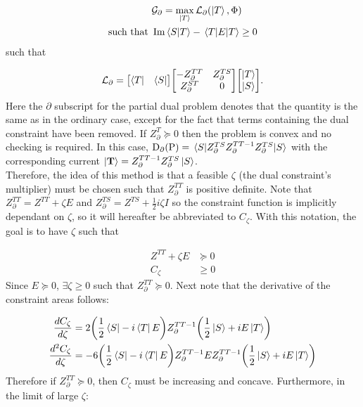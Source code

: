 \documentclass[reprint]{revtex4-2}
\begin{document}
\begin{align}
	&\mathcal{G}_\partial = \max_{\ket{T}}\mathcal{L}_\partial\qty(\ket{T}, \Phi)\\
	\text{such that } &\Im\braket{S}{T} - \ev{E}{T}\ge 0
\end{align}
such that

\begin{align}
	\mathcal{L}_\partial = \mqty[\bra{T} & \bra{S}]\mqty[-Z^{TT}_\partial & Z^{TS}_\partial \\ Z^{ST}_\partial & 0]\mqty[\ket{T} \\ \ket{S}].
\end{align}
Here the $\partial$ subscript for the partial dual problem denotes that the quantity is the same as in the ordinary case, except for the fact that terms containing the dual constraint have been removed. If $Z^{T}_\partial\succcurlyeq 0$ then the problem is convex and no checking is required. In this case, $\text{D}_\partial(\text{P}) = \ev{Z^{TS}_\partial Z^{TT-1}_\partial Z^{TS}_\partial}{S}$ with the corresponding current $\ket{\vb{T}} = Z^{TT-1}_\partial Z^{TS}_\partial\ket{S}$.\\

Therefore, the idea of this method is that a feasible $\zeta$ (the dual constraint's multiplier) must be chosen such that $Z^{TT}_\partial$ is positive definite. Note that $Z^{TT}_\partial = Z^{TT} + \zeta E$ and $Z^{TS}_\partial = Z^{TS} + \frac{1}{2}i\zeta I$ so the constraint function is implicitly dependant on $\zeta$, so it will hereafter be abbreviated to $C_\zeta$. With this notation, the goal is to have $\zeta$ such that

\begin{align}
	Z^{TT}+\zeta E&\succcurlyeq0\\
	C_\zeta&\ge0
\end{align}
Since $E\succcurlyeq0$, $\exists\zeta\ge0$ such that $Z^{TT}_\partial\succcurlyeq0$. Next note that the derivative of the constraint areas follows:

\begin{align}
	\frac{dC_\zeta}{d\zeta} &= 2\qty(\frac{1}{2}\bra{S} - i\bra{T}E)Z^{TT-1}_\partial\qty(\frac{1}{2}\ket{S}+ iE\ket{T})\\
	\frac{d^2C_\zeta}{d\zeta} &= -6\qty(\frac{1}{2}\bra{S} - i\bra{T}E)Z^{TT-1}_\partial E Z^{TT-1}_\partial\qty(\frac{1}{2}\ket{S}+ iE\ket{T})
\end{align}
Therefore if $Z^{TT}_\partial\succcurlyeq0$, then $C_\zeta$ must be increasing and concave. Furthermore, in the limit of large $\zeta$:
\end{document}
